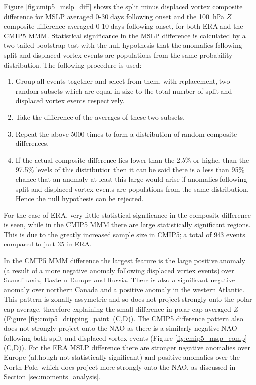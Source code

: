 \bigskip Figure \ref{fig:cmip5_mslp_diff} shows the split minus displaced vortex
composite difference for MSLP averaged 0-30 days following onset and the 100~hPa
$Z$ composite difference averaged 0-10 days following onset, for both ERA and
the CMIP5 MMM. Statistical significance in the MSLP difference is calculated by
a two-tailed bootstrap test with the null hypothesis that the anomalies
following split and displaced vortex events are populations from the same
probability distribution. The following procedure is used:
\begin{enumerate}
\item Group all events together and select from them, with replacement, two
  random subsets which are equal in size to the total number of split and
  displaced vortex events respectively. 
\item Take the difference of the averages of these two subsets. 
\item Repeat the above 5000 times to form a distribution of random composite
  differences. 
\item If the actual composite difference lies lower than the 2.5\% or higher
  than the 97.5\% levels of this distribution then it can be said there is a
  less than 95\% chance that an anomaly at least this large would arise if
  anomalies following split and displaced vortex events are populations from the
  same distribution. Hence the null hypothesis can be rejected.
\end{enumerate}
For the case of ERA, very little statistical significance in the
composite difference is seen, while in the CMIP5 MMM there are large
statistically significant regions. This is due to the greatly increased sample
size in CMIP5; a total of 943 events compared to just 35 in ERA. 

In the CMIP5 MMM difference the largest feature is the large positive anomaly (a
result of a more negative anomaly following displaced vortex events) over
Scandinavia, Eastern Europe and Russia. There is also a significant negative
anomaly over northern Canada and a positive anomaly in the western
Atlantic. This pattern is zonally assymetric and so does not project strongly
onto the polar cap average, therefore explaining the small difference in polar
cap averaged $Z$ (Figure \ref{fig:cmip5_dripping_paint} (C,D)). The CMIP5
difference pattern also does not strongly project onto the NAO as there is a
similarly negative NAO following both split and displaced vortex events (Figure
\ref{fig:cmip5_mslp_comp} (C,D)). For the ERA MSLP difference there are stronger
negative anomalies over Europe (although not statistically significant) and
positive anomalies over the North Pole, which does project more strongly onto
the NAO, as discussed in Section \ref{sec:moments_analysis}. 

